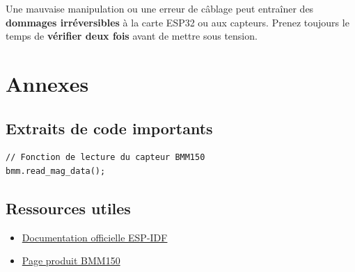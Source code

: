 \documentclass[a4paper,12pt]{article}
\begin{document}
\vspace{0.5cm}

\begin{tcolorbox}[colback=red!5!white, colframe=red!75!black, title=Important]
Une mauvaise manipulation ou une erreur de câblage peut entraîner des \textbf{dommages irréversibles} à la carte ESP32 ou aux capteurs. Prenez toujours le temps de \textbf{vérifier deux fois} avant de mettre sous tension.
\end{tcolorbox}


\section{Annexes}
\subsection{Extraits de code importants}
\begin{lstlisting}
// Fonction de lecture du capteur BMM150
bmm.read_mag_data();
\end{lstlisting}

\subsection{Ressources utiles}
\begin{itemize}
    \item \href{https://docs.espressif.com/projects/esp-idf/en/latest/}{Documentation officielle ESP-IDF}
    \item \href{https://wiki.dfrobot.com/SEN0529_BMM150_3-Axis_Magnetic_Field_Sensor_SKU_SEN0529}{Page produit BMM150}
\end{itemize}

\newpage


\end{document}
